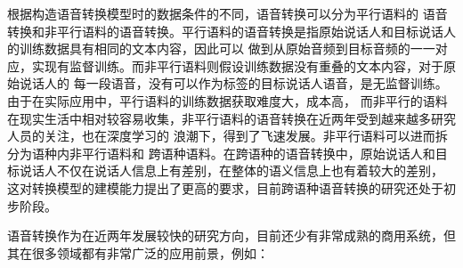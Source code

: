 根据构造语音转换模型时的数据条件的不同，语音转换可以分为平行语料的
语音转换和非平行语料的语音转换。平行语料的语音转换是指原始说话人和目标说话人的训练数据具有相同的文本内容，因此可以
做到从原始音频到目标音频的一一对应，实现有监督训练。而非平行语料则假设训练数据没有重叠的文本内容，对于原始说话人的
每一段语音，没有可以作为标签的目标说话人语音，是无监督训练。由于在实际应用中，平行语料的训练数据获取难度大，成本高，
而非平行的语料在现实生活中相对较容易收集，非平行语料的语音转换在近两年受到越来越多研究人员的关注，也在深度学习的
浪潮下，得到了飞速发展。非平行语料可以进而拆分为语种内非平行语料和
跨语种语料。在跨语种的语音转换中，原始说话人和目标说话人不仅在说话人信息上有差别，在整体的语义信息上也有着较大的差别，
这对转换模型的建模能力提出了更高的要求，目前跨语种语音转换的研究还处于初步阶段。

语音转换作为在近两年发展较快的研究方向，目前还少有非常成熟的商用系统，但其在很多领域都有非常广泛的应用前景，例如：
